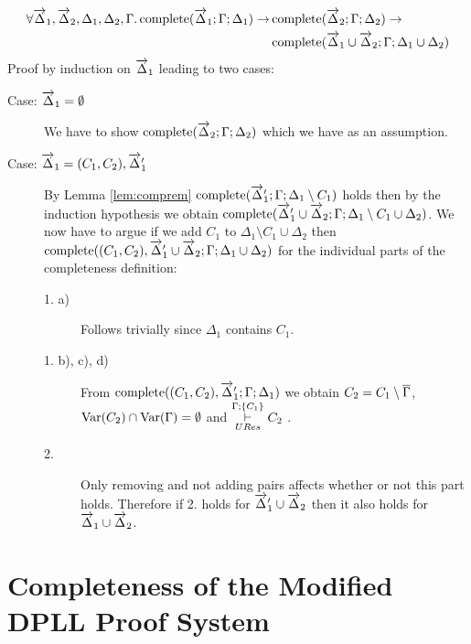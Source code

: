 \begin{mylemma}\label{lem:compunion}
\begin{align*}
\forall  \overrightarrow{\Delta}_1, \overrightarrow{\Delta}_2, \Delta_1, \Delta_2, \Gamma. \, \mathrm{complete}(\overrightarrow{\Delta}_1;\Gamma; \Delta_1) \to \, &\mathrm{complete}(\overrightarrow{\Delta}_2;\Gamma; \Delta_2) \to \\
&\mathrm{complete}(\overrightarrow{\Delta}_1 \cup \overrightarrow{\Delta}_2;\Gamma; \Delta_1 \cup \Delta_2)
\end{align*}
Proof by induction on $\overrightarrow{\Delta}_1$ leading to two cases:

\begin{description}
\item[Case: $\overrightarrow{\Delta}_1 = \emptyset$]
We have to show $\mathrm{complete}(\overrightarrow{\Delta}_2;\Gamma; \Delta_2)$ which we have as an assumption.

\item[Case: $\overrightarrow{\Delta}_1 = (C_1, C_2), \overrightarrow{\Delta}_1'$]
By Lemma \ref{lem:comprem} $\mathrm{complete}(\overrightarrow{\Delta}_1';\Gamma; \Delta_1 \setminus C_1)$ holds then by the induction hypothesis we obtain $\mathrm{complete}(\overrightarrow{\Delta}_1' \cup \overrightarrow{\Delta}_2;\Gamma; \Delta_1 \setminus C_1 \cup \Delta_2)$. We now have to argue if we add $C_1$ to $\Delta_1 \setminus C_1 \cup \Delta_2$ then $\mathrm{complete}((C_1, C_2), \overrightarrow{\Delta}_1' \cup \overrightarrow{\Delta}_2;\Gamma; \Delta_1 \cup \Delta_2)$ for the individual parts of the completeness definition:
\begin{description}
\item[1. a)] Follows trivially since $\Delta_1$ contains $C_1$.
\item[1. b), c), d)] From $\mathrm{complete}((C_1,C_2), \overrightarrow{\Delta}_1';\Gamma; \Delta_1)$ we obtain $C_2 = C_1 \setminus \overline{\Gamma}$, $\mathrm{Var}(C_2) \cap \mathrm{Var}(\Gamma) = \emptyset$ and $\overset{\Gamma;\{C_1 \}}{\underset{URes}{\vdash}} C_2$ .
\item[2.] Only removing and not adding pairs affects whether or not this part holds. Therefore if 2. holds for $\overrightarrow{\Delta}_1' \cup \overrightarrow{\Delta}_2$ then it also holds for $\overrightarrow{\Delta}_1 \cup \overrightarrow{\Delta}_2$.
\end{description}  
\end{description}
\end{mylemma}
\medskip

\section{Completeness of the Modified DPLL Proof System}

